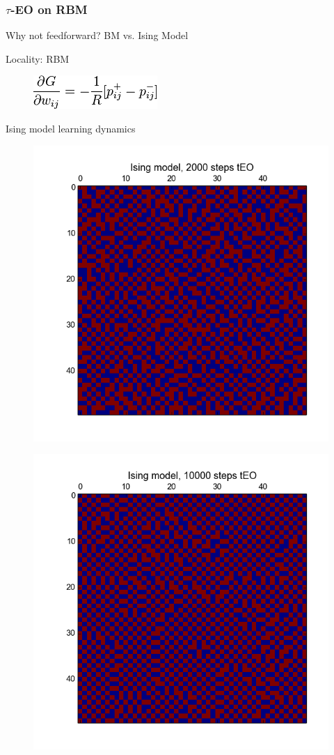 \documentclass{beamer}
\begin{document}
\begin{frame}
  \frametitle{$\tau$-EO on RBM}
  Why not feedforward? BM vs. Ising Model

  Locality: RBM

  \begin{figure}
    \includegraphics{rbm_eq}
  \end{figure}

  Ising model learning dynamics
  \begin{figure}
    \includegraphics{2000}
  \end{figure}
  \begin{figure}
    \includegraphics{10000}

\end{figure}
\end{frame}
\end{document}
